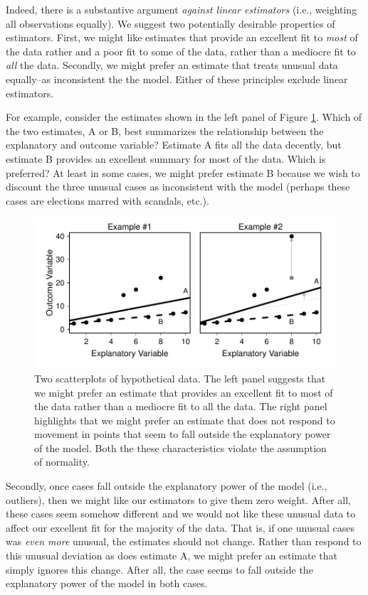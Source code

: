 \documentclass[12pt]{article}
\begin{document}
Indeed, there is a substantive argument \textit{against linear estimators} (i.e., weighting all observations equally). We suggest two potentially desirable properties of estimators. First, we might like estimates that provide an excellent fit to \textit{most} of the data rather and a poor fit to some of the data, rather than a mediocre fit to \textit{all} the data. Secondly, we might prefer an estimate that treats unusual data equally--as inconsistent the the model. Either of these principles exclude linear estimators.

For example, consider the estimates shown in the left panel of Figure \ref{fig:best-fit-illustration}. Which of the two estimates, A or B, best summarizes the relationship between the explanatory and outcome variable? Estimate A fits all the data decently, but estimate B provides an excellent summary for most of the data. Which is preferred? At least in some cases, we might prefer estimate B because we wish to discount the three unusual cases as inconsistent with the model (perhaps these cases are elections marred with scandals, etc.).

\begin{figure}[h!]
\begin{center}
\includegraphics[scale = .7]{figs/best-fit-illustration.pdf}
\caption{Two scatterplots of hypothetical data. The left panel suggests that we might prefer an estimate that provides an excellent fit to most of the data rather than a mediocre fit to all the data. The right panel highlights that we might prefer an estimate that does not respond to movement in points that seem to fall outside the explanatory power of the model. Both the these characteristics violate the assumption of normality.}\label{fig:best-fit-illustration}
\end{center}
\end{figure}

Secondly, once cases fall outside the explanatory power of the model (i.e., outliers), then we might like our estimators to give them zero weight. After all, these cases seem somehow different and we would not like these unusual data to affect our excellent fit for the majority of the data. That is, if one unusual cases was \textit{even more} unusual, the estimates should not change. Rather than respond to this unusual deviation as does estimate A, we might prefer an estimate that simply ignores this change. After all, the case seems to fall outside the explanatory power of the model in both cases.
\end{document}
